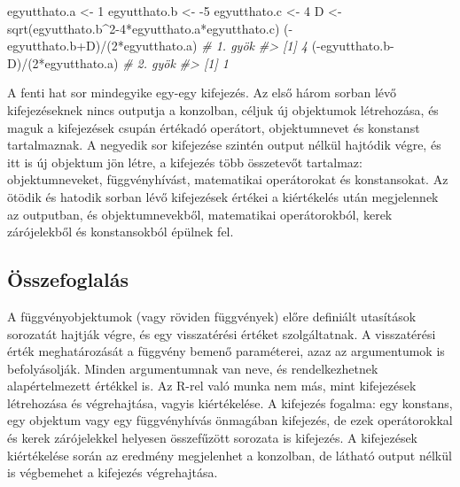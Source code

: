 \documentclass[
]{book}
\makeatletter
\newenvironment{Shaded}{\begin{snugshade}}{\end{snugshade}}
\newcommand{\CommentTok}[1]{\textcolor[rgb]{0.56,0.35,0.01}{\textit{#1}}}
\newcommand{\DecValTok}[1]{\textcolor[rgb]{0.00,0.00,0.81}{#1}}
\newcommand{\FunctionTok}[1]{\textcolor[rgb]{0.00,0.00,0.00}{#1}}
\newcommand{\NormalTok}[1]{#1}
\newcommand{\OtherTok}[1]{\textcolor[rgb]{0.56,0.35,0.01}{#1}}
\newcommand{\SpecialCharTok}[1]{\textcolor[rgb]{0.00,0.00,0.00}{#1}}
\newenvironment{kframe}{%
\medskip{}
\setlength{\fboxsep}{.8em}
 \def\at@end@of@kframe{}%
 \ifinner\ifhmode%
  \def\at@end@of@kframe{\end{minipage}}%
  \begin{minipage}{\columnwidth}%
 \fi\fi%
 \def\FrameCommand##1{\hskip\@totalleftmargin \hskip-\fboxsep
 \colorbox{shadecolor}{##1}\hskip-\fboxsep
     \hskip-\linewidth \hskip-\@totalleftmargin \hskip\columnwidth}%
 \MakeFramed {\advance\hsize-\width
   \@totalleftmargin\z@ \linewidth\hsize
   \@setminipage}}%
 {\par\unskip\endMakeFramed%
 \at@end@of@kframe}
\newenvironment{rmdblock}[1]
  {
  \begin{itemize}
  \renewcommand{\labelitemi}{
    \raisebox{-.7\height}[0pt][0pt]{
      {\setkeys{Gin}{width=3em,keepaspectratio}\texttt{[image: images/\#1]}}
    }
  }
  \setlength{\fboxsep}{1em}
  \begin{kframe}
  \item
  }
  {
  \end{kframe}
  \end{itemize}
  }
\newenvironment{rmdsummary}
  {\begin{rmdblock}{summary}}
  {\end{rmdblock}}
\makeatother
\begin{document}
\begin{Shaded}
\begin{Highlighting}[]
\NormalTok{egyutthato.a }\OtherTok{\textless{}{-}} \DecValTok{1}
\NormalTok{egyutthato.b }\OtherTok{\textless{}{-}} \SpecialCharTok{{-}}\DecValTok{5}
\NormalTok{egyutthato.c }\OtherTok{\textless{}{-}} \DecValTok{4}
\NormalTok{D }\OtherTok{\textless{}{-}} \FunctionTok{sqrt}\NormalTok{(egyutthato.b}\SpecialCharTok{\^{}}\DecValTok{2{-}4}\SpecialCharTok{*}\NormalTok{egyutthato.a}\SpecialCharTok{*}\NormalTok{egyutthato.c)}
\NormalTok{(}\SpecialCharTok{{-}}\NormalTok{egyutthato.b}\SpecialCharTok{+}\NormalTok{D)}\SpecialCharTok{/}\NormalTok{(}\DecValTok{2}\SpecialCharTok{*}\NormalTok{egyutthato.a)   }\CommentTok{\# 1. gyök}
\CommentTok{\#\textgreater{} [1] 4}
\NormalTok{(}\SpecialCharTok{{-}}\NormalTok{egyutthato.b}\SpecialCharTok{{-}}\NormalTok{D)}\SpecialCharTok{/}\NormalTok{(}\DecValTok{2}\SpecialCharTok{*}\NormalTok{egyutthato.a)   }\CommentTok{\# 2. gyök}
\CommentTok{\#\textgreater{} [1] 1}
\end{Highlighting}
\end{Shaded}

A fenti hat sor mindegyike egy-egy kifejezés. Az első három sorban lévő kifejezéseknek nincs outputja a konzolban, céljuk új objektumok létrehozása, és maguk a kifejezések csupán értékadó operátort, objektumnevet és konstanst tartalmaznak. A negyedik sor kifejezése szintén output nélkül hajtódik végre, és itt is új objektum jön létre, a kifejezés több összetevőt tartalmaz: objektumneveket, függvényhívást, matematikai operátorokat és konstansokat. Az ötödik és hatodik sorban lévő kifejezések értékei a kiértékelés után megjelennek az outputban, és objektumnevekből, matematikai operátorokból, kerek zárójelekből és konstansokból épülnek fel.

\hypertarget{az-r-nyelv-2-summary}{%
\subsection{Összefoglalás}\label{az-r-nyelv-2-summary}}

\begin{rmdsummary}
A függvényobjektumok (vagy röviden függvények) előre definiált
utasítások sorozatát hajtják végre, és egy visszatérési értéket
szolgáltatnak. A visszatérési érték meghatározását a függvény bemenő
paraméterei, azaz az argumentumok is befolyásolják. Minden argumentumnak
van neve, és rendelkezhetnek alapértelmezett értékkel is. Az R-rel való
munka nem más, mint kifejezések létrehozása és végrehajtása, vagyis
kiértékelése. A kifejezés fogalma: egy konstans, egy objektum vagy egy
függvényhívás önmagában kifejezés, de ezek operátorokkal és kerek
zárójelekkel helyesen összefűzött sorozata is kifejezés. A kifejezések
kiértékelése során az eredmény megjelenhet a konzolban, de látható
output nélkül is végbemehet a kifejezés végrehajtása.
\end{rmdsummary}
\end{document}
